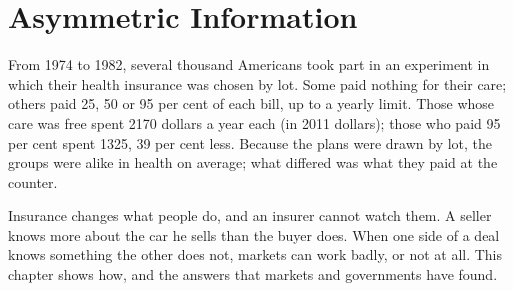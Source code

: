 \chapter{Asymmetric Information}\label{ch:g11:asymmetric-information}

From 1974 to 1982, several thousand Americans took part in an experiment in which their health insurance was chosen by lot. Some paid nothing for their care; others
paid 25, 50 or 95 per cent of each bill, up to a yearly limit. Those whose care was free spent 2170 dollars a year each (in 2011 dollars); those who paid 95 per cent
spent 1325, 39 per cent less. Because the plans were drawn by lot, the groups were alike in health on average; what differed was what they
paid at the counter.

Insurance changes what people do, and an insurer cannot watch them. A seller knows more about the car he sells than the buyer does. When one side of a deal knows
something the other does not, markets can work badly, or not at all. This chapter shows how, and the answers that markets and governments have found.

